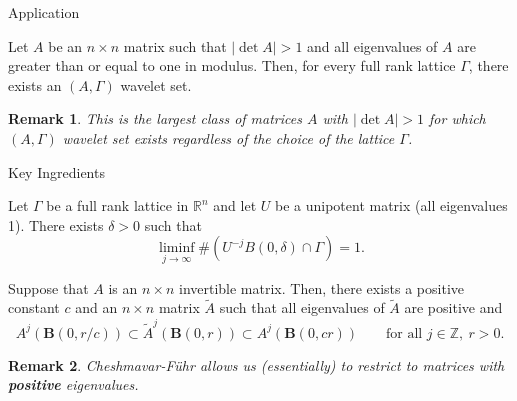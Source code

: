 \documentclass{sintefbeamer}
\newcommand{\Z}{{\mathbb {Z}}}
\newcommand{\R}{{\mathbb {R}}}
\newtheorem{remark}{Remark}
\begin{document}
\begin{frame}{Application}
    \begin{theorem}[Bownik-S]
Let $A$ be an $n\times n$ matrix such that $\left | \det A \right |>1$ and all eigenvalues of $A$ are greater than or equal to one in modulus. Then, for every full rank lattice $\Gamma$, there exists an $(A, \Gamma)$ wavelet set.
    \end{theorem}



\pause \begin{remark}
This is the largest class of matrices $A$ with $\left | \det A \right |>1$ for which $(A, \Gamma)$ wavelet set exists regardless of the choice of the lattice $\Gamma$.
\end{remark}
\end{frame}


\begin{frame}{Key Ingredients}
    \begin{theorem}[Margulis 1971]
Let $\Gamma$ be a full rank lattice in $\R^n$ and let $U$ be a unipotent matrix (all eigenvalues 1). There exists $\delta > 0$ such that 
$$
\liminf_{j \to \infty}  \#(U^{-j} B(0, \delta) \cap \Gamma)= 1.
$$
\end{theorem}

\pause
\begin{theorem}
     Suppose that $A$ is an $n\times n$ invertible matrix. Then, there exists a positive constant $c$ and an $n\times n$ matrix $\tilde A$ such that all eigenvalues of $\tilde A$ are positive
 and
\begin{equation*}\label{ite1}
A^j(\mathbf B(0,r/c)) \subset \tilde A^j(\mathbf B(0,r)) 
\subset A^j(\mathbf B(0,cr))
\qquad\text{for all }j\in \Z, \ r>0.
\end{equation*}
\end{theorem}

\pause
\begin{remark}
    Cheshmavar-F\"uhr allows us (essentially) to restrict to matrices with {\bf{positive}} eigenvalues.
\end{remark}

\end{frame}
\end{document}
